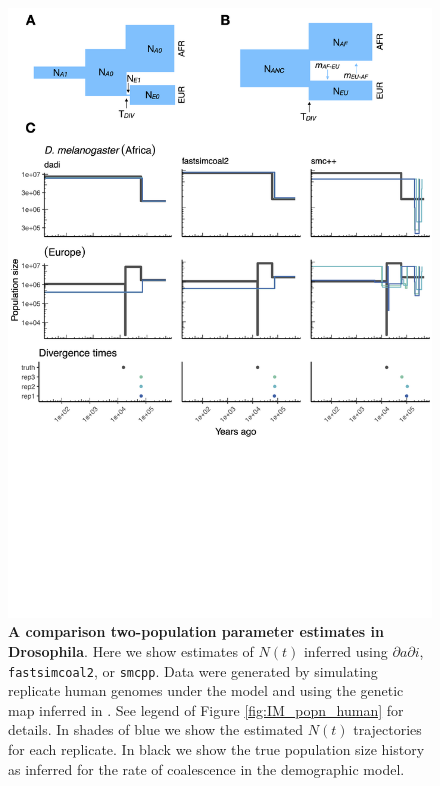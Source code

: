 \documentclass[12pt,halfline,a4paper]{ouparticle}
\newcommand{\stopsupplement}{%
        \setcounter{table}{0}
        \renewcommand{\thetable}{\arabic{table}}%
        \setcounter{figure}{0}
        \renewcommand{\thefigure}{\arabic{figure}}%
     }
\newcommand{\dadi}{$\partial a \partial i$\xspace}
\newcommand{\smcpp}{\texttt{smcpp}\xspace}
\begin{document}
\begin{figure}
\begin{center}
\includegraphics[width=0.8\linewidth]{display_items/d_mel_two_popn_comp.png}
\caption{\textbf{A comparison two-population parameter estimates in Drosophila}. Here we show estimates of $N(t)$ inferred using \dadi, \texttt{fastsimcoal2}, or \smcpp.
Data were generated by simulating
replicate human genomes under the \cite{li2006inferring} model and using the genetic map
inferred in \cite{comeron2012many}. See legend of Figure \ref{fig:IM_popn_human} for details.
In shades of blue we show the estimated
$N(t)$ trajectories for each replicate. In black we show the true population size history as inferred
for the rate of coalescence in the demographic model.}
\label{fig:two_popn_fly}
\end{center}
\end{figure}

\stopsupplement
\end{document}
